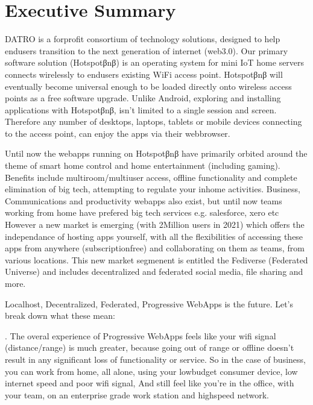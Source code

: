 \documentclass[letterpaper,10pt,openany,oneside,english]{sphinxmanual}
\begin{document}
\chapter{Executive Summary}
\label{\detokenize{executivesummary:executive-summary}}\label{\detokenize{executivesummary::doc}}
\sphinxAtStartPar
DATRO is a for\sphinxhyphen{}profit consortium of technology solutions, designed to help end\sphinxhyphen{}users transition to the next generation of internet (web3.0).
Our primary software solution (Hotspotβnβ) is an operating system for mini IoT home servers connects wirelessly to end\sphinxhyphen{}users existing Wi\sphinxhyphen{}Fi access point.
Hotspotβnβ will eventually become universal enough to be loaded directly onto wireless access points as a free software upgrade.
Unlike Android, exploring and installing applications with Hotspotβnβ, isn’t limited to a single session and screen.
Therefore any number of desktops, laptops, tablets or mobile devices connecting to the access point, can enjoy the apps via their web\sphinxhyphen{}browser.

\sphinxAtStartPar
Until now the webapps running on Hotspotβnβ have primarily orbited around the theme of smart home control and home entertainment (including gaming).
Benefits include multi\sphinxhyphen{}room/multi\sphinxhyphen{}user access, offline functionality and complete elimination of big tech, attempting to regulate your in\sphinxhyphen{}home activities.
Business, Communications and productivity webapps also exist, but until now teams working from home have prefered big tech services e.g. salesforce, xero etc
However a new market is emerging (with 2Million users in 2021) which offers the independance of hosting apps yourself,
with all the flexibilities of accessing these apps from anywhere (subscription\sphinxhyphen{}free) and collaborating on them as teams, from various locations.
This new market segmenent is entitled the Fediverse (Federated Universe) and includes decentralized and federated social media, file sharing and more.

\sphinxAtStartPar
Localhost, Decentralized, Federated, Progressive WebApps is the future. Let’s break down what these mean:

.  The overal experience of Progressive WebApps feels like your wi\sphinxhyphen{}fi signal (distance/range) is much greater, because going out of range or offline doesn’t result in any significant loss of functionality or service.
So in the case of business, you can work from home, all alone, using your low\sphinxhyphen{}budget consumer device, low internet speed and poor wi\sphinxhyphen{}fi signal,
And still feel like you’re in the office, with your team, on an enterprise grade work station and high\sphinxhyphen{}speed network.
\end{document}
